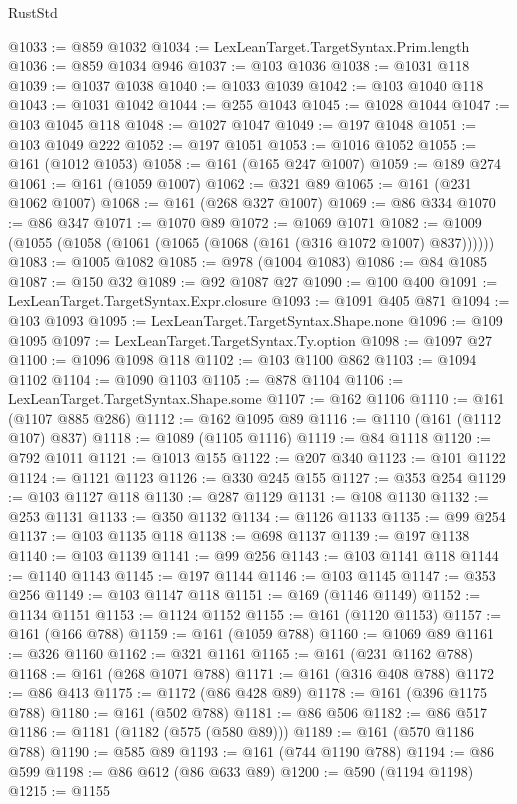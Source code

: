 \begin{lexlean}{RustStd}
\begin{coremodule}
@1033 := @859 @1032
@1034 := LexLeanTarget.TargetSyntax.Prim.length
@1036 := @859 @1034 @946
@1037 := @103 @1036
@1038 := @1031 @118
@1039 := @1037 @1038
@1040 := @1033 @1039
@1042 := @103 @1040 @118
@1043 := @1031 @1042
@1044 := @255 @1043
@1045 := @1028 @1044
@1047 := @103 @1045 @118
@1048 := @1027 @1047
@1049 := @197 @1048
@1051 := @103 @1049 @222
@1052 := @197 @1051
@1053 := @1016 @1052
@1055 := @161 (@1012 @1053)
@1058 := @161 (@165 @247 @1007)
@1059 := @189 @274
@1061 := @161 (@1059 @1007)
@1062 := @321 @89
@1065 := @161 (@231 @1062 @1007)
@1068 := @161 (@268 @327 @1007)
@1069 := @86 @334
@1070 := @86 @347
@1071 := @1070 @89
@1072 := @1069 @1071
@1082 := @1009 (@1055 (@1058 (@1061 (@1065 (@1068 (@161 (@316 @1072 @1007) @837))))))
@1083 := @1005 @1082
@1085 := @978 (@1004 @1083)
@1086 := @84 @1085
@1087 := @150 @32
@1089 := @92 @1087 @27
@1090 := @100 @400
@1091 := LexLeanTarget.TargetSyntax.Expr.closure
@1093 := @1091 @405 @871
@1094 := @103 @1093
@1095 := LexLeanTarget.TargetSyntax.Shape.none
@1096 := @109 @1095
@1097 := LexLeanTarget.TargetSyntax.Ty.option
@1098 := @1097 @27
@1100 := @1096 @1098 @118
@1102 := @103 @1100 @862
@1103 := @1094 @1102
@1104 := @1090 @1103
@1105 := @878 @1104
@1106 := LexLeanTarget.TargetSyntax.Shape.some
@1107 := @162 @1106
@1110 := @161 (@1107 @885 @286)
@1112 := @162 @1095 @89
@1116 := @1110 (@161 (@1112 @107) @837)
@1118 := @1089 (@1105 @1116)
@1119 := @84 @1118
@1120 := @792 @1011
@1121 := @1013 @155
@1122 := @207 @340
@1123 := @101 @1122
@1124 := @1121 @1123
@1126 := @330 @245 @155
@1127 := @353 @254
@1129 := @103 @1127 @118
@1130 := @287 @1129
@1131 := @108 @1130
@1132 := @253 @1131
@1133 := @350 @1132
@1134 := @1126 @1133
@1135 := @99 @254
@1137 := @103 @1135 @118
@1138 := @698 @1137
@1139 := @197 @1138
@1140 := @103 @1139
@1141 := @99 @256
@1143 := @103 @1141 @118
@1144 := @1140 @1143
@1145 := @197 @1144
@1146 := @103 @1145
@1147 := @353 @256
@1149 := @103 @1147 @118
@1151 := @169 (@1146 @1149)
@1152 := @1134 @1151
@1153 := @1124 @1152
@1155 := @161 (@1120 @1153)
@1157 := @161 (@166 @788)
@1159 := @161 (@1059 @788)
@1160 := @1069 @89
@1161 := @326 @1160
@1162 := @321 @1161
@1165 := @161 (@231 @1162 @788)
@1168 := @161 (@268 @1071 @788)
@1171 := @161 (@316 @408 @788)
@1172 := @86 @413
@1175 := @1172 (@86 @428 @89)
@1178 := @161 (@396 @1175 @788)
@1180 := @161 (@502 @788)
@1181 := @86 @506
@1182 := @86 @517
@1186 := @1181 (@1182 (@575 (@580 @89)))
@1189 := @161 (@570 @1186 @788)
@1190 := @585 @89
@1193 := @161 (@744 @1190 @788)
@1194 := @86 @599
@1198 := @86 @612 (@86 @633 @89)
@1200 := @590 (@1194 @1198)
@1215 := @1155

\end{coremodule}
\end{lexlean}
